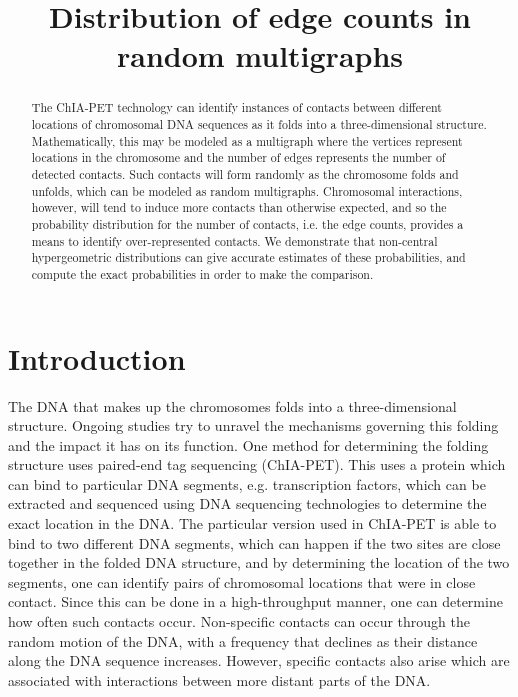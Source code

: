 \documentclass{myaptpub}%
\begin{document}
\title{Distribution of edge counts in random multigraphs}




\begin{abstract}
The ChIA-PET technology can identify instances of contacts between different locations of chromosomal DNA sequences as it folds into a three-dimensional structure. Mathematically, this may be modeled as a multigraph where the vertices represent locations in the chromosome and the number of edges represents the number of detected contacts. Such contacts will form randomly as the chromosome folds and unfolds, which can be modeled as random multigraphs. Chromosomal interactions, however, will tend to induce more contacts than otherwise expected, and so the probability distribution for the number of contacts, i.e. the edge counts, provides a means to identify over-represented contacts. We demonstrate that non-central hypergeometric distributions can give accurate estimates of these probabilities, and compute the exact probabilities in order to make the comparison.  
\end{abstract}

\keywords{} %

\ams{}{} %


\section{Introduction}

The DNA that makes up the chromosomes folds into a three-dimensional structure. Ongoing studies try to unravel the mechanisms governing this folding and the impact it has on its function. One method for determining the folding structure uses paired-end tag sequencing (ChIA-PET). This uses a protein which can bind to particular DNA segments, e.g. transcription factors, which can be extracted and sequenced using DNA sequencing technologies to determine the exact location in the DNA. The particular version used in ChIA-PET is able to bind to two different DNA segments, which can happen if the two sites are close together in the folded DNA structure, and by determining the location of the two segments, one can identify pairs of chromosomal locations that were in close contact. Since this can be done in a high-throughput manner, one can determine how often such contacts occur. Non-specific contacts can occur through the random motion of the DNA, with a frequency that declines as their distance along the DNA sequence increases. However, specific contacts also arise which are associated with interactions between more distant parts of the DNA.
\end{document}
